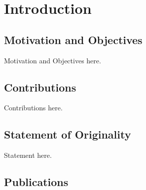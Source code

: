 
\chapter{Introduction}

\section{Motivation and Objectives}

Motivation and Objectives here.



\section{Contributions}

Contributions here.


\section{Statement of Originality}

Statement here.
\cite{chau12}
\cite{chau13a}
\cite{chau13b}


\section{Publications}

\begingroup
\renewcommand{\chapter}[2]{}%

\endgroup

